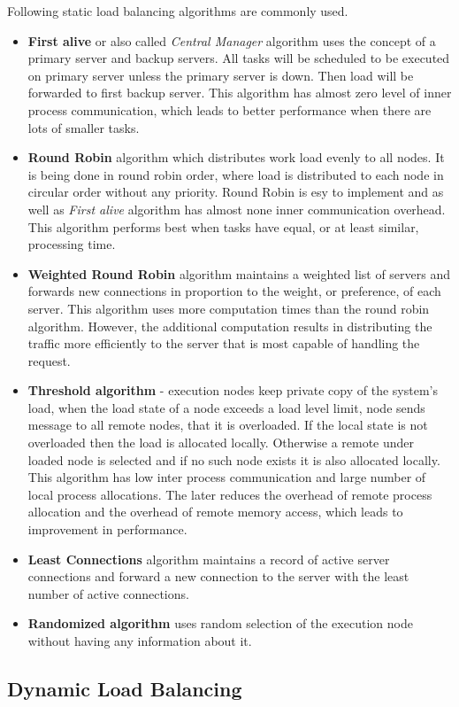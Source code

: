 Following static load balancing algorithms are commonly used.
\begin{itemize}
    \item \textbf{First alive} or also called \textit{Central Manager} algorithm uses the concept of a primary server and backup servers.\cite{web:ibmLoadBalancingDecisions}
    All tasks will be scheduled to be executed on primary server unless the primary server is down.
    Then load will be forwarded to first backup server.
    This algorithm has almost zero level of inner process communication, which leads to better performance when there are lots of smaller tasks.

    \item \textbf{Round Robin} algorithm which distributes work load evenly to all nodes.
    It is being done in round robin order, where load is distributed to each node in circular order without any priority.
    Round Robin is esy to implement and as well as \textit{First alive} algorithm has almost none inner communication overhead.
    This algorithm performs best when tasks have equal, or at least similar, processing time.

    \item \textbf{Weighted Round Robin} algorithm maintains a weighted list of servers and forwards new connections in proportion to the weight, or preference,
    of each server.
    This algorithm uses more computation times than the round robin algorithm.
    However, the additional computation results in distributing the traffic more efficiently to the server that is most capable of handling the request.\cite{web:ibmLoadBalancingDecisions}

    \item \textbf{Threshold algorithm} - execution nodes keep private copy of the system's load, when the load state of a node exceeds a load level limit,
    node sends message to all remote nodes, that it is overloaded.
    If the local state is not overloaded then the load is allocated locally.
    Otherwise a remote under loaded node is selected and if no such node exists it is also allocated locally.
    This algorithm has low inter process communication and large number of local process allocations.
    The later reduces the overhead of remote process allocation and the overhead of remote memory access, which leads to improvement in performance.\cite{web:qDifferenceBetweenStaticAndDynamicBalancing}

    \item \textbf{Least Connections} algorithm maintains a record of active server connections
    and forward a new connection to the server with the least number of active connections.\cite{web:ibmLoadBalancingDecisions}

    \item \textbf{Randomized algorithm} uses random selection of the execution node without having any information about it.

\end{itemize}

\subsection{Dynamic Load Balancing}\label{subsec:dynamic-load-balancing}
